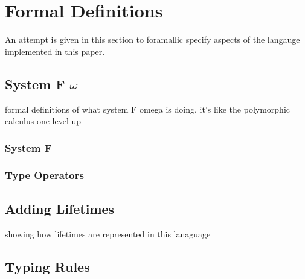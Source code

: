 \chapter{Formal Definitions}\label{sec:formal}
An attempt is given in this section to foramallic specify aspects of the langauge
implemented in this paper.

\section{System F $\omega$}
formal definitions of what system F omega is doing, it's like the polymorphic
calculus one level up

\subsection{System F}

\subsection{Type Operators}

\section{Adding Lifetimes}
showing how lifetimes are represented in this lanaguage

\section{Typing Rules}

